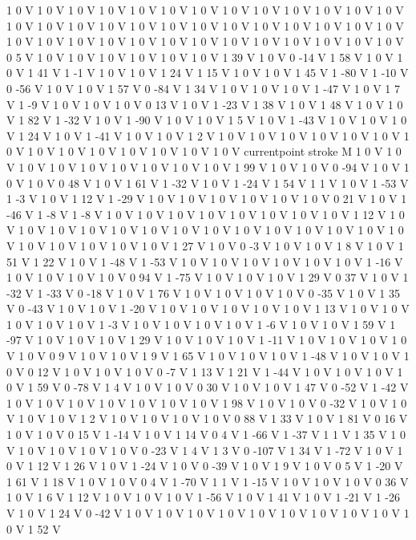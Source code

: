 {{1 0 V
1 0 V
1 0 V
1 0 V
1 0 V
1 0 V
1 0 V
1 0 V
1 0 V
1 0 V
1 0 V
1 0 V
1 0 V
1 0 V
1 0 V
1 0 V
1 0 V
1 0 V
1 0 V
1 0 V
1 0 V
1 0 V
1 0 V
1 0 V
1 0 V
1 0 V
1 0 V
1 0 V
1 0 V
1 0 V
1 0 V
1 0 V
1 0 V
1 0 V
1 0 V
1 0 V
1 0 V
1 0 V
1 0 V
0 5 V
1 0 V
1 0 V
1 0 V
1 0 V
1 0 V
1 0 V
1 39 V
1 0 V
0 -14 V
1 58 V
1 0 V
1 0 V
1 41 V
1 -1 V
1 0 V
1 0 V
1 24 V
1 15 V
1 0 V
1 0 V
1 45 V
1 -80 V
1 -10 V
0 -56 V
1 0 V
1 0 V
1 57 V
0 -84 V
1 34 V
1 0 V
1 0 V
1 0 V
1 -47 V
1 0 V
1 7 V
1 -9 V
1 0 V
1 0 V
1 0 V
0 13 V
1 0 V
1 -23 V
1 38 V
1 0 V
1 48 V
1 0 V
1 0 V
1 82 V
1 -32 V
1 0 V
1 -90 V
1 0 V
1 0 V
1 5 V
1 0 V
1 -43 V
1 0 V
1 0 V
1 0 V
1 24 V
1 0 V
1 -41 V
1 0 V
1 0 V
1 2 V
1 0 V
1 0 V
1 0 V
1 0 V
1 0 V
1 0 V
1 0 V
1 0 V
1 0 V
1 0 V
1 0 V
1 0 V
1 0 V
1 0 V
currentpoint stroke M
1 0 V
1 0 V
1 0 V
1 0 V
1 0 V
1 0 V
1 0 V
1 0 V
1 0 V
1 99 V
1 0 V
1 0 V
0 -94 V
1 0 V
1 0 V
1 0 V
0 48 V
1 0 V
1 61 V
1 -32 V
1 0 V
1 -24 V
1 54 V
1 1 V
1 0 V
1 -53 V
1 -3 V
1 0 V
1 12 V
1 -29 V
1 0 V
1 0 V
1 0 V
1 0 V
1 0 V
1 0 V
0 21 V
1 0 V
1 -46 V
1 -8 V
1 -8 V
1 0 V
1 0 V
1 0 V
1 0 V
1 0 V
1 0 V
1 0 V
1 0 V
1 12 V
1 0 V
1 0 V
1 0 V
1 0 V
1 0 V
1 0 V
1 0 V
1 0 V
1 0 V
1 0 V
1 0 V
1 0 V
1 0 V
1 0 V
1 0 V
1 0 V
1 0 V
1 0 V
1 0 V
1 27 V
1 0 V
0 -3 V
1 0 V
1 0 V
1 8 V
1 0 V
1 51 V
1 22 V
1 0 V
1 -48 V
1 -53 V
1 0 V
1 0 V
1 0 V
1 0 V
1 0 V
1 0 V
1 -16 V
1 0 V
1 0 V
1 0 V
1 0 V
0 94 V
1 -75 V
1 0 V
1 0 V
1 0 V
1 29 V
0 37 V
1 0 V
1 -32 V
1 -33 V
0 -18 V
1 0 V
1 76 V
1 0 V
1 0 V
1 0 V
1 0 V
0 -35 V
1 0 V
1 35 V
0 -43 V
1 0 V
1 0 V
1 -20 V
1 0 V
1 0 V
1 0 V
1 0 V
1 0 V
1 13 V
1 0 V
1 0 V
1 0 V
1 0 V
1 0 V
1 -3 V
1 0 V
1 0 V
1 0 V
1 0 V
1 -6 V
1 0 V
1 0 V
1 59 V
1 -97 V
1 0 V
1 0 V
1 0 V
1 29 V
1 0 V
1 0 V
1 0 V
1 -11 V
1 0 V
1 0 V
1 0 V
1 0 V
1 0 V
0 9 V
1 0 V
1 0 V
1 9 V
1 65 V
1 0 V
1 0 V
1 0 V
1 -48 V
1 0 V
1 0 V
1 0 V
0 12 V
1 0 V
1 0 V
1 0 V
0 -7 V
1 13 V
1 21 V
1 -44 V
1 0 V
1 0 V
1 0 V
1 0 V
1 59 V
0 -78 V
1 4 V
1 0 V
1 0 V
0 30 V
1 0 V
1 0 V
1 47 V
0 -52 V
1 -42 V
1 0 V
1 0 V
1 0 V
1 0 V
1 0 V
1 0 V
1 0 V
1 98 V
1 0 V
1 0 V
0 -32 V
1 0 V
1 0 V
1 0 V
1 0 V
1 2 V
1 0 V
1 0 V
1 0 V
1 0 V
0 88 V
1 33 V
1 0 V
1 81 V
0 16 V
1 0 V
1 0 V
0 15 V
1 -14 V
1 0 V
1 14 V
0 4 V
1 -66 V
1 -37 V
1 1 V
1 35 V
1 0 V
1 0 V
1 0 V
1 0 V
1 0 V
0 -23 V
1 4 V
1 3 V
0 -107 V
1 34 V
1 -72 V
1 0 V
1 0 V
1 12 V
1 26 V
1 0 V
1 -24 V
1 0 V
0 -39 V
1 0 V
1 9 V
1 0 V
0 5 V
1 -20 V
1 61 V
1 18 V
1 0 V
1 0 V
0 4 V
1 -70 V
1 1 V
1 -15 V
1 0 V
1 0 V
1 0 V
0 36 V
1 0 V
1 6 V
1 12 V
1 0 V
1 0 V
1 0 V
1 -56 V
1 0 V
1 41 V
1 0 V
1 -21 V
1 -26 V
1 0 V
1 24 V
0 -42 V
1 0 V
1 0 V
1 0 V
1 0 V
1 0 V
1 0 V
1 0 V
1 0 V
1 0 V
1 0 V
1 52 V
}}
